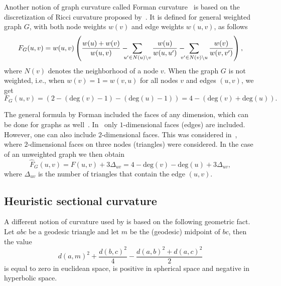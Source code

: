 \documentclass{article} %
\begin{document}
Another notion of graph curvature called Forman curvature~\citep{sreejith2016forman} is based on the discretization of Ricci curvature proposed by~\citet{forman2003bochner}. It is defined for general weighted graph $G$, with both node weights $w(v)$ and edge weights $w(u,v)$, as follows
\begin{equation}\label{eq:forman}
	F_G(u,v) = w(u,v) \left(\frac{w(u) + w(v)}{w(u,v)} - \hspace{-8pt}\sum_{u^\prime \in N(u)\setminus v}  \frac{w(u)}{w(u,u^\prime)} - \hspace{-8pt} \sum_{v^\prime \in N(v) \setminus u} \frac{w(v)}{w(v,v^\prime)}\right),
\end{equation}
where $N(v)$ denotes the neighborhood of a node $v$. 
When the graph $G$ is not weighted, i.e., when $w(v) = 1 = w(v,u)$ for all nodes $v$ and edges $(u,v)$, we get
\begin{equation}\label{eq:forman2}
F_G(u,v) = \left(2 - (\mathrm{deg}(v) - 1) - (\mathrm{deg}(u) - 1)\right) = 4 - (\mathrm{deg}(v) + \mathrm{deg}(u)).
\end{equation}

The general formula by Forman included the faces of any dimension, which can be done for graphs as well~\citep{weber2017coarse}. In~ only $1$-dimensional faces (edges) are included. However, one can also include $2$-dimensional faces. This was considered in~\cite{samal2018comparative}, where $2$-dimensional faces on three nodes (triangles) were considered. In the case of an unweighted graph we then obtain
\begin{equation}\label{eq:def_forman_curvature_triangles}
	\hat F_G(u,v) = F(u,v) + 3\Delta_{uv} 
	= 4 - \mathrm{deg}(v) - \mathrm{deg}(u) + 3\Delta_{uv},
\end{equation}
where $\Delta_{uv}$ is the number of triangles that contain the edge $(u,v)$. 



\subsection{Heuristic sectional curvature}

A different notion of curvature used by \citep{gu2019learning} is based on the following geometric fact. 
Let $abc$ be a geodesic triangle and let $m$ be the (geodesic) midpoint of $bc$, then the value
\begin{equation}\label{eq:parallelogram_law}
	d(a,m)^2 + \frac{d(b,c)^2}{4} - \frac{d(a,b)^2 + d(a,c)^2}{2}
\end{equation}
is equal to zero in euclidean space, is positive in spherical space and negative in hyperbolic space.
\end{document}
